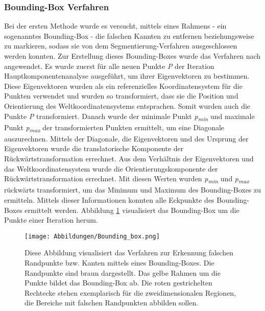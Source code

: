 \subsubsection{Bounding-Box Verfahren}
Bei der ersten Methode wurde es versucht, mittels eines Rahmens - ein sogenanntes Bounding-Box - die falschen Kannten zu entfernen beziehungsweise zu markieren, sodass sie von dem Segmentierung-Verfahren ausgeschlossen werden konnten. Zur Erstellung dieses Bounding-Boxes wurde das Verfahren nach \textcite{noauthor_find_2015} angewendet. Es wurde zuerst für alle neuen Punkte \textit{P} der Iteration Hauptkomponentenanalyse ausgeführt, um ihrer Eigenvektoren zu bestimmen. Diese Eigenvektoren wurden als ein referenzielles Koordinatensystem für die Punkten verwendet und wurden so transformiert, dass sie die Position und Orientierung des Weltkoordinatensystems entsprachen. Somit wurden auch die Punkte \textit{P} transformiert. Danach wurde der minimale Punkt \textit{p\textsubscript{min}} und maximale Punkt \textit{p\textsubscript{max}} der transformierten Punkten ermittelt, um eine Diagonale auszurechnen. Mittels der Diagonale, die Eigenvektoren und des Ursprung der Eigenvektoren wurde die translatorische Komponente der Rückwärtstransformation errechnet. Aus dem Verhältnis der Eigenvektoren und das Weltkoordinatensystem wurde die Orientierungskomponente der Rückwärtstransformation errechnet. Mit diesen Werten wurden \textit{p\textsubscript{min}} und \textit{p\textsubscript{max}} rückwärts transformiert, um das Minimum und Maximum des Bounding-Boxes zu ermitteln. Mittels dieser Informationen konnten alle Eckpunkte des Bounding-Boxes ermittelt werden. Abbildung \ref{fig: bounding_box} visualisiert das Bounding-Box um die Punkte einer Iteration herum.

\begin{figure}[h]
	\texttt{[image: Abbildungen/Bounding\_box.png]}
	\centering
	\caption{Diese Abbildung visualisiert das Verfahren zur Erkennung falschen Randpunkte bzw. Kanten mittels eines Bounding-Boxes. Die Randpunkte sind braun dargestellt. Das gelbe Rahmen um die Punkte bildet das Bounding-Box ab. Die roten gestrichelten Rechtecke stehen exemplarisch für die zweidimensionalen Regionen, die Bereiche mit falschen Randpunkten abbilden sollen.}
	\label{fig: bounding_box}
\end{figure}

